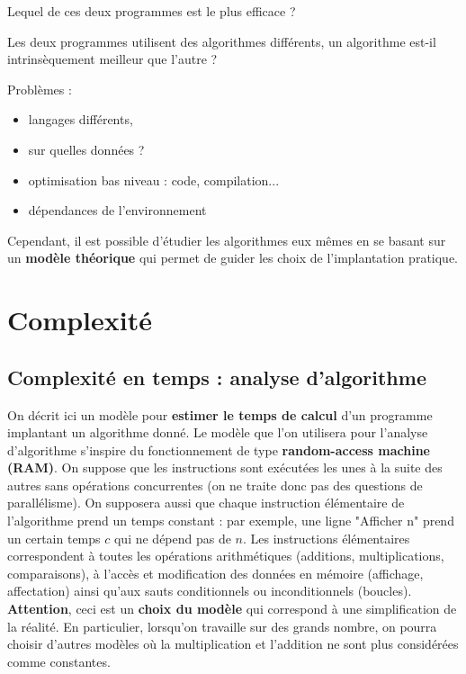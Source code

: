\documentclass{../cours}
\begin{document}
\begin{Example}
\label{ex:puissance-prog}
Lequel de ces deux programmes est le plus efficace ?



\pagebreak 


\end{Example}

Les deux programmes utilisent des algorithmes différents, un algorithme est-il intrinsèquement meilleur que l'autre ?
 
Problèmes :

\begin{itemize}
\item langages différents,
\item sur quelles données ?
\item optimisation bas niveau : code, compilation...
\item dépendances de l'environnement
\end{itemize}

Cependant, il est possible d'étudier les algorithmes eux mêmes en se basant sur un \textbf{modèle théorique} qui permet de guider les choix de l'implantation pratique.

\section{Complexité}

\subsection{Complexité en temps : analyse d'algorithme}

On décrit ici un modèle pour \textbf{estimer le temps de calcul} d'un programme implantant un algorithme donné. Le modèle que l'on utilisera pour l'analyse d'algorithme s'inspire du fonctionnement de type \textbf{random-access machine (RAM)}. On suppose que les instructions sont exécutées les unes à la suite des autres sans opérations concurrentes (on ne traite donc pas des questions de parallélisme). On supposera aussi que chaque instruction élémentaire de l'algorithme prend un temps constant : par exemple, une ligne "Afficher n" prend un certain temps $c$ qui ne dépend pas de $n$. Les instructions élémentaires correspondent à toutes les opérations arithmétiques (additions, multiplications, comparaisons), à l'accès et modification des données en mémoire (affichage, affectation) ainsi qu'aux sauts conditionnels ou inconditionnels (boucles).  \textbf{Attention}, ceci est un \textbf{choix du modèle} qui correspond à une simplification de la réalité. En particulier, lorsqu'on travaille sur des grands nombre, on pourra choisir d'autres modèles où la multiplication et l'addition ne sont plus considérées comme constantes. 
\end{document}
